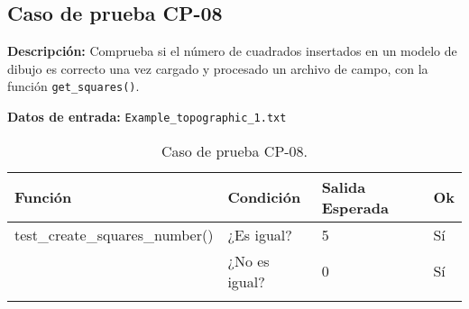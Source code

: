 \subsection{Caso de prueba CP-08}

\textbf{Descripción:} Comprueba si el número de cuadrados insertados en un modelo de dibujo es correcto una vez cargado y procesado un archivo de campo, con la función \texttt{get\_squares()}.

\textbf{Datos de entrada:} \texttt{Example\_topographic\_1.txt}


\begin{longtable}[]{@{}llll@{}}
\toprule
\begin{minipage}[b]{0.6\columnwidth}\raggedright\strut
Función\strut
\end{minipage} & \begin{minipage}[b]{0.20\columnwidth}\raggedright\strut
Condición\strut
\end{minipage} & \begin{minipage}[b]{0.15\columnwidth}\raggedright\strut
Salida Esperada\strut
\end{minipage} & \begin{minipage}[b]{0.05\columnwidth}\raggedright\strut
Ok\strut
\end{minipage}\tabularnewline
\midrule
\endhead
\begin{minipage}[t]{0.6\columnwidth}\raggedright\strut
\small{test\_create\_squares\_number()}\strut
\end{minipage} & \begin{minipage}[t]{0.20\columnwidth}\raggedright\strut
¿Es igual?\strut
\end{minipage} & \begin{minipage}[t]{0.15\columnwidth}\raggedright\strut
5\strut
\end{minipage} & \begin{minipage}[t]{0.05\columnwidth}\raggedright\strut
Sí\strut
\end{minipage}\tabularnewline
\begin{minipage}[t]{0.6\columnwidth}\raggedright\strut
\strut
\end{minipage} & \begin{minipage}[t]{0.20\columnwidth}\raggedright\strut
¿No es igual?\strut
\end{minipage} & \begin{minipage}[t]{0.15\columnwidth}\raggedright\strut
0\strut
\end{minipage} & \begin{minipage}[t]{0.05\columnwidth}\raggedright\strut
Sí\strut
\end{minipage}\tabularnewline

\bottomrule
\caption{Caso de prueba CP-08.}
\end{longtable}

